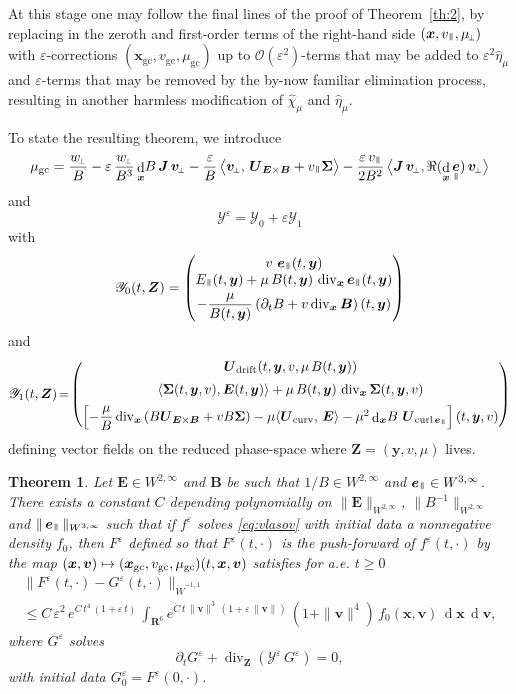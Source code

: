 \documentclass[JEP,XML,SOM,Unicode]{cedram}
\let\mathcal\mathscr
\newcommand\mto{\mathchoice{\longmapsto}{\mapsto}{\mapsto}{\mapsto}}
\newcommand{\sperp}{{\scriptscriptstyle\perp}}
\newcommand{\blangle}{\bigl\langle}
\newcommand{\brangle}{\bigr\rangle}
\let\eps\varepsilon
\let\d\partial
\DeclareMathOperator\dD{d}\let\dd\dD
\DeclareMathOperator{\Div}{div}
\DeclareMathOperator{\Curl}{curl}
\theoremstyle{plain}
\newtheorem{theorem}{Theorem}[section]
\theoremstyle{definition}
\newcommand\bp{\begin{pmatrix}}
\newcommand\ep{\end{pmatrix}}
\newcommand{\be}{\begin{equation}}
\newcommand{\ee}{\end{equation}}
\newcommand{\bt}{\begin{theorem}}
\newcommand{\et}{\end{theorem}}
\newcommand\R{\mathbf R}
\newcommand\bB{{\boldsymbol B}}
\newcommand\bE{{\boldsymbol E}}
\newcommand\bJ{{\boldsymbol J}}
\newcommand\bU{{\boldsymbol U}}
\newcommand\bfv{{\boldsymbol v}}
\newcommand\bfx{{\boldsymbol x}}
\newcommand\bfy{{\boldsymbol y}}
\newcommand\bfZ{{\boldsymbol Z}}
\newcommand\Sig{{\boldsymbol \Sigma}}
\newcommand\cO{{\mathcal O}}
\newcommand\cY{{\mathcal Y}}
\DeclareMathOperator{\beD}{\boldsymbol{e}}
\newcommand\eDpar{\beD_\mypar}
\newcommand\vpar{v_\mypar}
\newcommand\bvperp{\bfv_{\!\sperp}}
\newcommand\eperp{w_{\!\sperp}}
\newcommand\muperp{\mu_{\!\sperp}}
\newcommand\Epar{E_\mypar}
\newcommand{\GC}{\bfx_\mathrm{gc}}
\newcommand{\vGC}{v_\mathrm{gc}}
\newcommand{\muGC}{\mu_\mathrm{gc}}
\newcommand{\EcB}{\bU_{\bE\times\bB}}
\newcommand{\curvB}{\bU_{\mathrm{curv}}}
\newcommand{\rotB}{\bU_{\Curl\eDpar}}
\newcommand{\Ud}{\bU_{\mathrm{drift}}}
\newcommand{\mypar}{{\mkern3mu\vphantom{\perp}\vrule depth 0pt\mkern2mu\vrule depth 0pt\mkern3mu}}
\begin{document}
At this stage one may follow the final lines of the proof of Theorem~\ref{th:2}, by replacing in the zeroth and first-order terms of the right-hand side $(\bfx,\vpar,\muperp)$ with $\eps$-corrections $(\GC,\vGC,\muGC)$ up to $\cO(\eps^2)$-terms that may be added to $\eps^2\widehat\eta_\mu$ and $\eps$-terms that may be removed by the by-now familiar elimination process, resulting in another harmless modification of $\widehat\chi_\mu$ and $\widehat\eta_\mu$.

To state the resulting theorem, we introduce
\be\label{muGC}
\muGC=
\frac{\eperp}{B}
-\eps\,\frac{\eperp}{B^3}\dD_\bfx\!B\, \bJ\,\bvperp
-\frac{\eps}{B} \,\blangle\bvperp,
\,\EcB+\vpar\Sig\brangle
-\frac{\eps\,\vpar}{2B^2}
\,\blangle\bJ\,\bvperp,\Re(\dD_\bfx\eDpar)\,\bvperp\brangle
\ee
and
\[
\cY^\eps=\cY_0+\eps\cY_1
\]
with
\[
\cY_0(t,\bfZ)
=\bp
v\,\eDpar(t,\bfy)\\
\Epar(t,\bfy)+\mu\,B(t,\bfy)\,\Div_\bfx\eDpar(t,\bfy)\\[3pt]
-\dfrac{\mu}{B(t,\bfy)}\left(\d_tB+v\Div_\bfx\bB\right)(t,\bfy)
\ep
\]
and
\[
\cY_1(t,\bfZ)
\!=\! \bp
\Ud(t,\bfy,v,\mu\,B(t,\bfy))
\\[5pt]
\langle\Sig(t,\bfy,v),\bE(t,\bfy)\rangle
+\mu\,B(t,\bfy)\,\Div_\bfx\Sig(t,\bfy,v)
\\[5pt]
\left[-\dfrac{\mu}{B}\Div_\bfx\left(B \EcB+v B\Sig\right)
-\mu\langle\curvB,\,\bE\rangle
-\mu^2\dD_\bfx\!B\ \rotB\right](t,\bfy,v)
\ep
\]
defining vector fields on the reduced phase-space where $\bfZ=(\bfy,v,\mu)$ lives.

\bt
\label{th:2-mu}
Let $\bE\in W^{2,\infty}$ and $\bB$ be such that $1/B\in W^{2,\infty}$ and $\eDpar\in W^{3,\infty}$. There exists a constant $C$ depending polynomially on $\|\bE\|_{W^{2,\infty}}$, $\|B^{-1}\|_{W^{2,\infty}}$ and $\|\eDpar\|_{W^{3,\infty}}$ such that if $f^\eps$ solves \eqref{eq:vlasov} with initial data a nonnegative density $f_0$, then $F^\eps$ defined so that $F^\eps(t,\cdot)$ is the push-forward of $f^\eps(t,\cdot)$ by the map $(\bfx,\bfv)\mto (\GC,\vGC,\muGC)(t,\bfx,\bfv)$ satisfies for a.e. $t\geq0$
\begin{multline*}
\|F^\eps(t,\cdot)-G^\eps(t,\cdot)\|_{\dot{W}^{-1,1}}\\
\leq
C\,\eps^2\,e^{C\,t^4\,(1+\eps\,t)}\,\int_{\R^6} e^{C\,t\,\|\bfv\|^3\,(1+\eps\,\|\bfv\|)}\,(1+\|\bfv\|^4)\,f_0(\bfx,\bfv)\,\dD\bfx\,\dD\bfv,
\end{multline*}
where $G^\eps$ solves
\be
\label{eq:2nd-mu}
\d_t G^\eps+\Div_{\bfZ} \left(\cY^\eps\,G^\eps\right)
=0,
\ee
with initial data $G_{0}^\eps=F^\eps(0,\cdot)$.
\et




\end{document}
